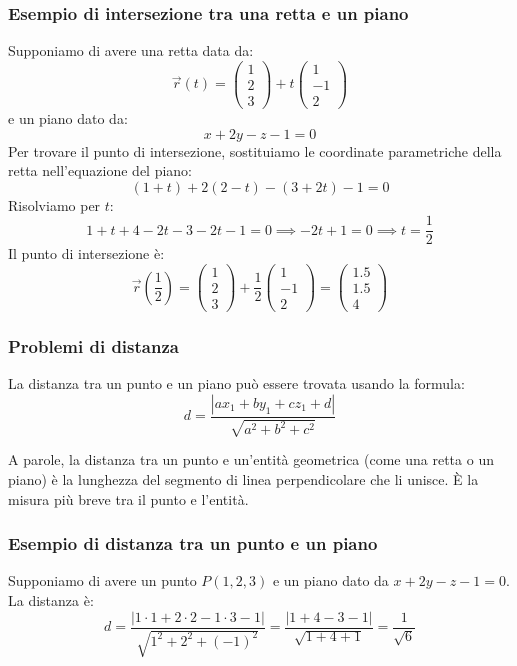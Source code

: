 \documentclass{article}
\begin{document}
\subsubsection{Esempio di intersezione tra una retta e un piano}
Supponiamo di avere una retta data da:
\[
    \vec{r}(t) = \begin{pmatrix} 1 \\ 2 \\ 3 \end{pmatrix}
    + t \begin{pmatrix} 1 \\ -1 \\ 2 \end{pmatrix}
\]
e un piano dato da:
\[
    x + 2y - z - 1 = 0
\]
Per trovare il punto di intersezione, sostituiamo le coordinate parametriche della retta
nell'equazione del piano:
\[
    (1 + t) + 2(2 - t) - (3 + 2t) - 1 = 0
\]
Risolviamo per \(t\):
\[
    1 + t + 4 - 2t - 3 - 2t - 1 = 0 \implies -2t + 1 = 0 \implies t = \frac{1}{2}
\]
Il punto di intersezione è:
\[
    \vec{r}\left(\frac{1}{2}\right) = \begin{pmatrix} 1 \\ 2 \\ 3 \end{pmatrix}
    + \frac{1}{2} \begin{pmatrix} 1 \\ -1 \\ 2 \end{pmatrix} =
    \begin{pmatrix} 1.5 \\ 1.5 \\ 4 \end{pmatrix}
\]

\subsubsection{Problemi di distanza}
La distanza tra un punto e un piano può essere trovata usando la formula:
\[
    d = \frac{|ax_1 + by_1 + cz_1 + d|}{\sqrt{a^2 + b^2 + c^2}}
\]

A parole, la distanza tra un punto e un'entità geometrica (come una retta o un piano) è la
lunghezza del segmento di linea perpendicolare che li unisce. È la misura più breve tra il
punto e l'entità.

\subsubsection{Esempio di distanza tra un punto e un piano}
Supponiamo di avere un punto \(P(1, 2, 3)\) e un piano dato da \(x + 2y - z - 1 = 0\).
La distanza è:
\[
    d = \frac{|1 \cdot 1 + 2 \cdot 2 - 1 \cdot 3 - 1|}{\sqrt{1^2 + 2^2 + (-1)^2}} =
    \frac{|1 + 4 - 3 - 1|}{\sqrt{1 + 4 + 1}} = \frac{1}{\sqrt{6}}
\]
\end{document}
